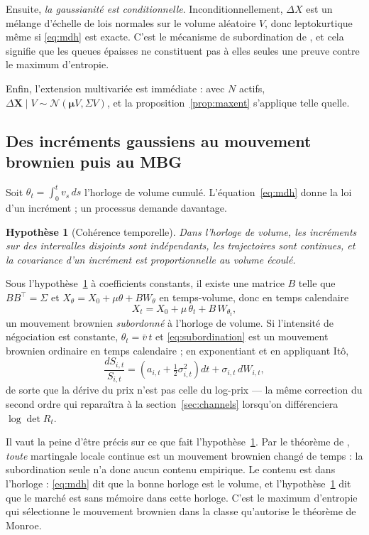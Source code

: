 \documentclass[11pt]{article}
\newtheorem{assumption}{Hypothèse}
\theoremstyle{definition}
\theoremstyle{remark}
\begin{document}
Ensuite, \emph{la gaussianité est conditionnelle}. Inconditionnellement,
$\Delta X$ est un mélange d'échelle de lois normales sur le volume aléatoire $V$,
donc leptokurtique même si \eqref{eq:mdh} est exacte. C'est le mécanisme de
subordination de \citet{mandelbrot1967}, et cela signifie que les queues épaisses
ne constituent pas à elles seules une preuve contre le maximum d'entropie.

Enfin, l'extension multivariée est immédiate : avec $N$ actifs,
$\Delta \mathbf{X}\mid V \sim \mathcal N(\boldsymbol\mu V, \Sigma V)$, et la
proposition~\ref{prop:maxent} s'applique telle quelle.

\subsection{Des incréments gaussiens au mouvement brownien puis au MBG}

Soit $\theta_t=\int_0^t v_s\,ds$ l'horloge de volume cumulé.
L'équation~\eqref{eq:mdh} donne la loi d'un incrément ; un processus demande
davantage.

\begin{assumption}[Cohérence temporelle]\label{as:time}
Dans l'horloge de volume, les incréments sur des intervalles disjoints sont
indépendants, les trajectoires sont continues, et la covariance d'un incrément
est proportionnelle au volume écoulé.
\end{assumption}

Sous l'hypothèse~\ref{as:time} à coefficients constants, il existe une matrice
$B$ telle que $BB^{\!\top}=\Sigma$ et $X_\theta = X_0 + \mu\theta + BW_\theta$ en
temps-volume, donc en temps calendaire
\begin{equation}
\label{eq:subordination}
X_t = X_0 + \mu\,\theta_t + B\,W_{\theta_t},
\end{equation}
un mouvement brownien \emph{subordonné} à l'horloge de volume. Si l'intensité de
négociation est constante, $\theta_t=\bar v\,t$ et \eqref{eq:subordination} est
un mouvement brownien ordinaire en temps calendaire ; en exponentiant et en
appliquant Itô,
\begin{equation}
\frac{dS_{i,t}}{S_{i,t}} = \left(a_{i,t}+\tfrac12\sigma_{i,t}^2\right)dt + \sigma_{i,t}\,dW_{i,t},
\end{equation}
de sorte que la dérive du prix n'est pas celle du log-prix --- la même correction
du second ordre qui reparaîtra à la section~\ref{sec:channels} lorsqu'on
différenciera $\log\det R_t$.

Il vaut la peine d'être précis sur ce que fait l'hypothèse~\ref{as:time}. Par le
théorème de \citet{monroe1978}, \emph{toute} martingale locale continue est un
mouvement brownien changé de temps : la subordination seule n'a donc aucun
contenu empirique. Le contenu est dans l'horloge : \eqref{eq:mdh} dit que la
bonne horloge est le volume, et l'hypothèse~\ref{as:time} dit que le marché est
sans mémoire dans cette horloge. C'est le maximum d'entropie qui sélectionne le
mouvement brownien dans la classe qu'autorise le théorème de Monroe.
\end{document}
